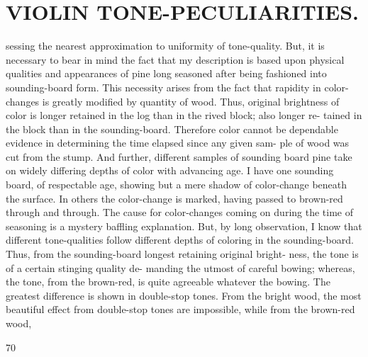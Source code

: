 \documentclass{article}
\begin{document}
\section*{VIOLIN TONE-PECULIARITIES.}
sessing the nearest approximation to uniformity of tone-quality. But, it is necessary to bear in mind the fact that my description is based upon physical qualities and appearances of pine long seasoned after being fashioned into sounding-board form. This necessity arises from the fact that rapidity in color- changes is greatly modified by quantity of wood. Thus, original brightness of color is longer retained in the log than in the rived block; also longer re- tained in the block than in the sounding-board. Therefore color cannot be dependable evidence in determining the time elapsed since any given sam- ple of wood was cut from the stump. And further, different samples of sounding board pine take on widely differing depths of color with advancing age. I have one sounding board, of respectable age, showing but a mere shadow of color-change beneath the surface. In others the color-change is marked, having passed to brown-red through and through. The cause for color-changes coming on during the time of seasoning is a mystery baffling explanation. But, by long observation, I know that different tone-qualities follow different depths of coloring in the sounding-board. Thus, from the sounding-board longest retaining original bright- ness, the tone is of a certain stinging quality de- manding the utmost of careful bowing; whereas, the tone, from the brown-red, is quite agreeable whatever the bowing. The greatest difference is shown in double-stop tones. From the bright wood, the most beautiful effect from double-stop tones are impossible, while from the brown-red wood,

70
\end{document}
